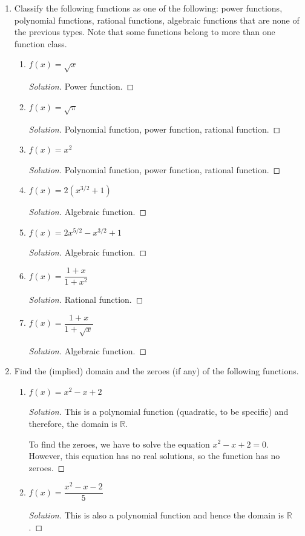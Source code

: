 \documentclass[12pt]{article}
\newenvironment{solution}{\begin{proof}[Solution]}{\end{proof}}
\begin{document}
\begin{enumerate}
		\item Classify the following functions as one of the following: power functions, polynomial functions, rational functions, algebraic functions that are none of the previous types. Note that some functions belong to more than one function class.
		\begin{enumerate}
			\item $f(x)=\sqrt{x}$
			\begin{solution}
				Power function.
			\end{solution}
			\item $f(x)=\sqrt{\pi}$
			\begin{solution}
				Polynomial function, power function, rational function.
			\end{solution}
			\item $f(x)=x^2$
			\begin{solution}
				Polynomial function, power function, rational function.
			\end{solution}
			\item $f(x)=2(x^{3/2}+1)$
			\begin{solution}
				Algebraic function.
			\end{solution}
			\item $f(x)=2x^{5/2}-x^{3/2}+1$
			\begin{solution}
				Algebraic function.
			\end{solution}
			\item $f(x)=\dfrac{1+x}{1+x^2}$
			\begin{solution}
				Rational function.
			\end{solution}
			\item $f(x)=\dfrac{1+x}{1+\sqrt{x}}$
			\begin{solution}
				Algebraic function.
			\end{solution}
		\end{enumerate}
		
		
		
		\item Find the (implied) domain and the zeroes (if any) of the following functions.
		\begin{enumerate}
			\item $f(x)=x^2-x+2$
		
			\begin{solution}
				This is a polynomial function (quadratic, to be specific) and therefore, the domain is $\mathbb{R}$.
				
				To find the zeroes, we have to solve the equation $x^2-x+2=0$. However, this equation has no real solutions, so the function has no zeroes.
			\end{solution}
			\item $f(x)=\dfrac{x^2-x-2}{5}$
			\begin{solution}
				This is also a polynomial function and hence the domain is $\mathbb{R}$. 
				

\end{solution}
\end{enumerate}
\end{enumerate}
\end{document}
